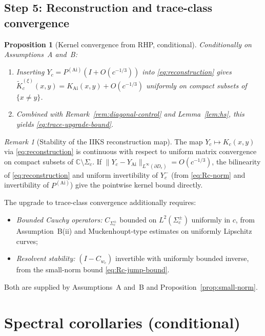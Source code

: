 \documentclass[12pt,a4paper]{amsart}
\newtheorem{proposition}[theorem]{Proposition}
\theoremstyle{definition}
\theoremstyle{remark}
\newtheorem{remark}[theorem]{Remark}
\begin{document}
\subsection{Step 5: Reconstruction and trace-class convergence}

\begin{proposition}[Kernel convergence from RHP, conditional]
\label{prop:kernel-from-rhp}
Conditionally on Assumptions~A and~B:
\begin{enumerate}[label=(\roman*)]
\item Inserting $Y_c=P^{(\mathrm{Ai})}(I+O(c^{-1/3}))$ into
  \eqref{eq:reconstruction} gives
  $\widetilde K_c^{(\xi)}(x,y)=K_{\mathrm{Ai}}(x,y)+O(c^{-1/3})$
  uniformly on compact subsets of $\{x\neq y\}$.
\item Combined with Remark~\ref{rem:diagonal-control} and
  Lemma~\ref{lem:hs}, this yields \eqref{eq:trace-upgrade-bound}.
\end{enumerate}
\end{proposition}

\begin{remark}[Stability of the IIKS reconstruction map]
\label{rem:reconstruction-stability}
The map $Y_c \mapsto K_c(x,y)$ via \eqref{eq:reconstruction}
is continuous with respect to uniform matrix convergence on compact
subsets of $\mathbb{C}\setminus\Sigma_c$.
If $\|Y_c - Y_{\mathrm{Ai}}\|_{L^\infty(\partial D_\epsilon)}= O(c^{-1/3})$,
the bilinearity of \eqref{eq:reconstruction} and uniform invertibility
of $Y_c^-$ (from \eqref{eq:Rc-norm} and invertibility of
$P^{(\mathrm{Ai})}$) give the pointwise kernel bound directly.

The upgrade to trace-class convergence additionally requires:
\begin{itemize}
\item \emph{Bounded Cauchy operators:}
  $C_{\Sigma_c^\pm}$ bounded on $L^2(\Sigma_c^\pm)$ uniformly in $c$,
  from Assumption~B(ii) and Muckenhoupt-type estimates on uniformly
  Lipschitz curves;
\item \emph{Resolvent stability:}
  $(I - C_{w_c})$ invertible with uniformly bounded inverse,
  from the small-norm bound \eqref{eq:Rc-jump-bound}.
\end{itemize}
Both are supplied by Assumptions~A and~B and
Proposition~\ref{prop:small-norm}.
\end{remark}

\section{Spectral corollaries (conditional)}
\label{sec:corollaries}
\end{document}
